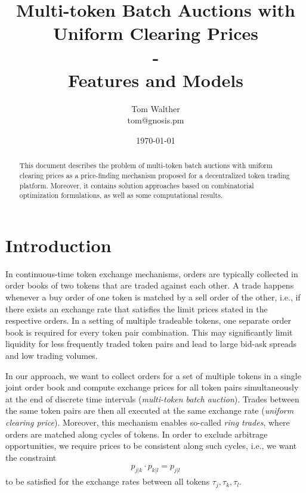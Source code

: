 \documentclass[11pt,parskip=full]{scrartcl}%
\title{
  Multi-token Batch Auctions with Uniform Clearing Prices\\
  - \\
  \Large Features and Models}
\author{Tom Walther \\ tom@gnosis.pm}
\date{\today}
\newcommand*{\ie}{i.e., }
\begin{document}
\maketitle


\begin{abstract}
  This document describes the problem of multi-token batch auctions with uniform clearing prices as
  a price-finding mechanism proposed for a decentralized token trading platform.
  Moreover, it contains solution approaches based on combinatorial optimization formulations, as
  well as some computational results.
\end{abstract}



\tableofcontents

\newpage
\section{Introduction}
\label{sec:introduction}

In continuous-time token exchange mechanisms, orders are typically collected in order books of two
tokens that are traded against each other.
A trade happens whenever a buy order of one token is matched by a sell order of the other, \ie if
there exists an exchange rate that satisfies the limit prices stated in the respective orders.
In a setting of multiple tradeable tokens, one separate order book is required for every token pair
combination.
This may significantly limit liquidity for less frequently traded token pairs and lead to large
bid-ask spreads and low trading volumes.

In our approach, we want to collect orders for a set of multiple tokens in a single joint order
book and compute exchange prices for all token pairs simultaneously at the end of discrete time
intervals (\emph{multi-token batch auction}).
Trades between the same token pairs are then all executed at the same exchange rate (\emph{uniform
clearing price}).
Moreover, this mechanism enables so-called \emph{ring trades}, where orders are matched along
cycles of tokens.
In order to exclude arbitrage opportunities, we require prices to be consistent along such cycles,
\ie we want the constraint
\begin{align}
  p_{j|k} \cdot p_{k|l} = p_{j|l}
  \label{eq:arbitrage_freeness}
\end{align}
to be satisfied for the exchange rates between all tokens $ \tau_j, \tau_k, \tau_l $.
\end{document}
